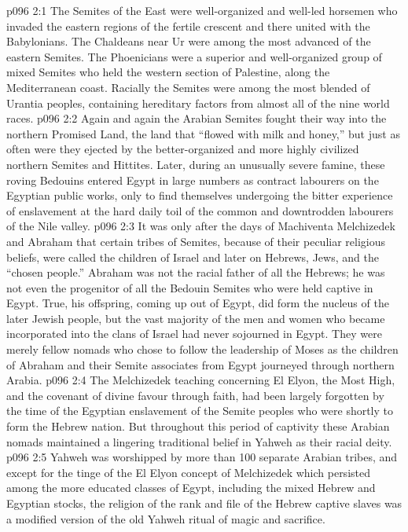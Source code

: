 \vs p096 2:1 The Semites of the East were well\hyp{}organized and well\hyp{}led horsemen who invaded the eastern regions of the fertile crescent and there united with the Babylonians. The Chaldeans near Ur were among the most advanced of the eastern Semites. The Phoenicians were a superior and well\hyp{}organized group of mixed Semites who held the western section of Palestine, along the Mediterranean coast. Racially the Semites were among the most blended of Urantia peoples, containing hereditary factors from almost all of the nine world races.
\vs p096 2:2 Again and again the Arabian Semites fought their way into the northern Promised Land, the land that “flowed with milk and honey,” but just as often were they ejected by the better\hyp{}organized and more highly civilized northern Semites and Hittites. Later, during an unusually severe famine, these roving Bedouins entered Egypt in large numbers as contract labourers on the Egyptian public works, only to find themselves undergoing the bitter experience of enslavement at the hard daily toil of the common and downtrodden labourers of the Nile valley.
\vs p096 2:3 It was only after the days of Machiventa Melchizedek and Abraham that certain tribes of Semites, because of their peculiar religious beliefs, were called the children of Israel and later on Hebrews, Jews, and the “chosen people.” Abraham was not the racial father of all the Hebrews; he was not even the progenitor of all the Bedouin Semites who were held captive in Egypt. True, his offspring, coming up out of Egypt, did form the nucleus of the later Jewish people, but the vast majority of the men and women who became incorporated into the clans of Israel had never sojourned in Egypt. They were merely fellow nomads who chose to follow the leadership of Moses as the children of Abraham and their Semite associates from Egypt journeyed through northern Arabia.
\vs p096 2:4 \pc The Melchizedek teaching concerning El Elyon, the Most High, and the covenant of divine favour through faith, had been largely forgotten by the time of the Egyptian enslavement of the Semite peoples who were shortly to form the Hebrew nation. But throughout this period of captivity these Arabian nomads maintained a lingering traditional belief in Yahweh as their racial deity.
\vs p096 2:5 Yahweh was worshipped by more than 100 separate Arabian tribes, and except for the tinge of the El Elyon concept of Melchizedek which persisted among the more educated classes of Egypt, including the mixed Hebrew and Egyptian stocks, the religion of the rank and file of the Hebrew captive slaves was a modified version of the old Yahweh ritual of magic and sacrifice.
